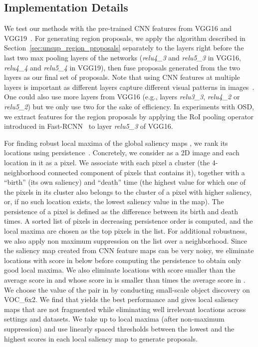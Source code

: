 \documentclass[runningheads]{llncs}
\begin{document}
\subsection{Implementation Details}
\label{sec:implementation}

 We test our methods with the pre-trained CNN features from VGG16 and VGG19~\cite{Symonian2014verydeep}. For generating region proposals, we apply the algorithm described in Section~\ref{sec:unsup_region_proposals} separately to the layers right before the last two max pooling layers of the networks (\textit{relu4\_3} and \textit{relu5\_3} in VGG16, \textit{relu4\_4} and \textit{relu5\_4} in VGG19), then fuse proposals generated from the two layers as our final set of proposals. Note that using CNN features at multiple layers is important as different layers capture different visual patterns in images~\cite{zeiler2013understanding}. One could also use more layers from VGG16 (e.g., layers \textit{relu3\_3}, \textit{relu4\_2} or \textit{relu5\_2}) but we only use two for the sake of efficiency. In experiments with OSD, we extract features for the region proposals by applying the RoI pooling operator introduced in Fast-RCNN~\cite{girshickICCV15fastrcnn} to layer \textit{relu5\_3} of VGG16.

 For finding robust local maxima of the global saliency maps , we rank its locations using persistence~\cite{Chazal2013persistence,Edelsbrunner2009introtopo,Edelsbrunner2002topo,Oudot2015persistence,Zomorodian2005compute}. Concretely, we consider  as a 2D image and each location in it as a pixel. We associate with each pixel a cluster (the 4-neighborhood connected component of pixels that contains it), together with a ``birth'' (its own saliency) and ``death'' time (the highest value for which one of the pixels in its cluster also belongs to the cluster of a pixel with higher saliency, or, if no such location exists, the lowest saliency value in the map). The persistence of a pixel is defined as the difference between its birth and death times. A sorted list of pixels in decreasing persistence order is computed, and the local maxima are chosen as the top pixels in the list. For additional robustness, we also apply non maximum suppression on the list over a  neighborhood. Since the saliency map created from CNN feature maps can be very noisy, we eliminate locations with score in  below  before computing the persistence to obtain only good local maxima. We also eliminate locations with score smaller than the average score in  and whose score in  is smaller than  times the average score in . We choose the value of the pair  in  by conducting small-scale object discovery on VOC\_6x2. We find that  yields the best performance and gives local saliency maps that are not fragmented while eliminating well irrelevant locations across settings and datasets. We take up to  local maxima (after non-maximum suppression) and use  linearly spaced thresholds between the lowest and the highest scores in each local saliency map to generate proposals. 
\end{document}
